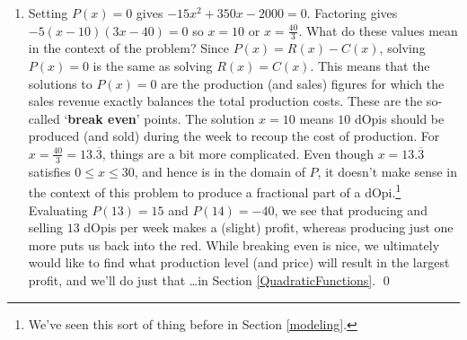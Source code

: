 \documentclass{ximera}
\begin{document}
\begin{example}
\begin{enumerate}
\item Setting $P(x) = 0$ gives $-15x^2+350x-2000 = 0$.  Factoring gives $-5(x-10)(3x-40) = 0$ so $x = 10$ or $x = \frac{40}{3}$.  What do these values mean in the context of the problem?  Since $P(x) = R(x) - C(x)$, solving $P(x) = 0$ is the same as solving $R(x) = C(x)$. This means that the solutions to $P(x) = 0$ are the production (and sales) figures for which the sales revenue exactly balances the total production costs.  These are the so-called `\textbf{break even}' points.  The solution $x=10$ means $10$ dOpis should be produced (and sold) during the week to recoup the cost of production. For $x = \frac{40}{3} = 13.\overline{3}$, things are a bit more complicated.  Even though $x = 13.\overline{3}$ satisfies $0 \leq x \leq 30$, and hence is in the domain of $P$, it doesn't make sense in the context of this problem to produce a fractional part of a dOpi.\footnote{We've seen this sort of thing before in Section \ref{modeling}.}  Evaluating $P(13) = 15$ and $P(14) = -40$, we see that producing and selling $13$ dOpis per week makes a (slight) profit, whereas producing just one more puts us back into the red. While breaking even is nice, we ultimately would like to find what production level (and price) will result in the largest profit, and we'll do just that \ldots in Section \ref{QuadraticFunctions}. \qed


\end{enumerate}

\end{example}
\end{document}
